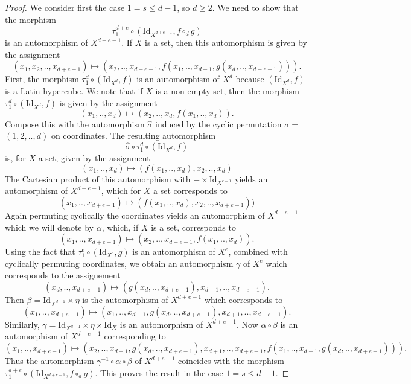 \documentclass[10pt,a4paper]{amsart}
\def\Id{\mathrm{Id}}             \def\tenA{\otimes_A}
\begin{document}
\begin{proof}
\medskip
We consider first the case $1=s\leq d-1$, so $d\geq 2$. We need to show that the morphism
$$\tau^{d+e}_1\circ (\Id_{X^{d+e-1}}, f\circ_d g)$$
is an automorphism of $X^{d+e-1}$. If $X$ is a set, then  this automorphism is given by 
the assignment
$$(x_1,x_2,..,x_{d+e-1}) \mapsto (x_2,..,x_{d+e-1}, f(x_1,..,x_{d-1},g(x_d,..,x_{d+e-1}))).$$
First, the morphism $\tau^d_1\circ (\Id_{X^d}, f)$ is an automorphism of $X^d$ because
$(\Id_{X^d},f)$ is a Latin hypercube. We note that if $X$ is a non-empty set, then the morphism 
$\tau^d_1\circ (\Id_{X^d}, f)$ is given by the assignment 
$$(x_1,..,x_d) \mapsto (x_2,..,x_d, f(x_1,..,x_d)).$$
Compose this with the automorphism $\hat\sigma$
induced by the cyclic permutation $\sigma=$ $(1,2,..,d)$ on coordinates. 
The resulting automorphism
$$\hat\sigma\circ\tau^d_1\circ (\Id_{X^d},f)$$
is, for $X$ a set, given by the assignment
$$(x_1,..,x_d) \mapsto (f(x_1,..,x_d),x_2,..,x_d)$$
The Cartesian product  of this automorphism with $-\times \Id_{X^{e-1}}$ yields
an automorphism of $X^{d+e-1}$, which for $X$ a set corresponds to 
$$(x_1,..,x_{d+e-1}) \mapsto (f(x_1,..,x_d),x_2,..,x_{d+e-1}))$$
Again permuting cyclically the coordinates yields an automorphism of $X^{d+e-1}$ 
which we will denote by $\alpha$, which, if
$X$ is a set,  corresponds to
$$(x_1,..,x_{d+e-1}) \mapsto (x_2,..,x_{d+e-1}, f(x_1,..,x_d)).$$
Using the fact that $\tau^e_1\circ (\Id_{X^e}, g)$ is an automorphism of $X^e$,
combined with cyclically permuting coordinates, we obtain an automorphism
$\gamma$ of $X^e$ which corresponds to the assignement
$$(x_d,..,x_{d+e-1}) \mapsto (g(x_d,..,x_{d+e-1}), x_{d+1},..,x_{d+e-1}).$$
Then $\beta = \Id_{X^{d-1}}\times \eta$ is the automorphism of $X^{d+e-1}$
which corresponds to
$$(x_1,..,x_{d+e-1}) \mapsto (x_1,..,x_{d-1}, g(x_d,..,x_{d+e-1}), x_{d+1},..,x_{d+e-1}).$$
Similarly, $\gamma=\Id_{X^{d-1}}\times \eta \times \Id_X$ is an automorphism of 
$X^{d+e-1}$.
Now $\alpha\circ\beta$ is an automorphism of $X^{d+e-1}$ corresponding to
$$(x_1,..,x_{d+e-1}) \mapsto (x_2,..,x_{d-1},g(x_d,..,x_{d+e-1}),x_{d+1},..,x_{d+e-1},
f(x_1,..,x_{d-1}, g(x_d,..,x_{d+e-1}))).$$
Thus the automorphism $\gamma^{-1}\circ\alpha\circ\beta$ of $X^{d+e-1}$
coincides with the morphism $\tau^{d+e}_1\circ (\Id_{X^{d+e-1}}, f\circ_d g)$.
This proves the result in  the case $1=s\leq d-1$.


\end{proof}
\end{document}
